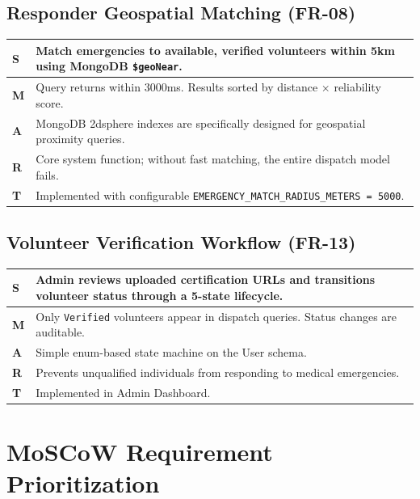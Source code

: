 \documentclass[12pt,a4paper]{article}
\begin{document}
\subsection{Responder Geospatial Matching (FR-08)}
\begin{tabularx}{\textwidth}{|l|X|}
\hline
\rowcolor{lightorange}
\textbf{S} & Match emergencies to available, verified volunteers within 5km using MongoDB \texttt{\$geoNear}. \\
\hline
\textbf{M} & Query returns within 3000ms. Results sorted by distance $\times$ reliability score. \\
\hline
\textbf{A} & MongoDB 2dsphere indexes are specifically designed for geospatial proximity queries. \\
\hline
\textbf{R} & Core system function; without fast matching, the entire dispatch model fails. \\
\hline
\textbf{T} & Implemented with configurable \texttt{EMERGENCY\_MATCH\_RADIUS\_METERS = 5000}. \\
\hline
\end{tabularx}

\subsection{Volunteer Verification Workflow (FR-13)}
\begin{tabularx}{\textwidth}{|l|X|}
\hline
\rowcolor{lightorange}
\textbf{S} & Admin reviews uploaded certification URLs and transitions volunteer status through a 5-state lifecycle. \\
\hline
\textbf{M} & Only \texttt{Verified} volunteers appear in dispatch queries. Status changes are auditable. \\
\hline
\textbf{A} & Simple enum-based state machine on the User schema. \\
\hline
\textbf{R} & Prevents unqualified individuals from responding to medical emergencies. \\
\hline
\textbf{T} & Implemented in Admin Dashboard. \\
\hline
\end{tabularx}

\renewcommand{\arraystretch}{1.0}

\section{MoSCoW Requirement Prioritization}
\end{document}
